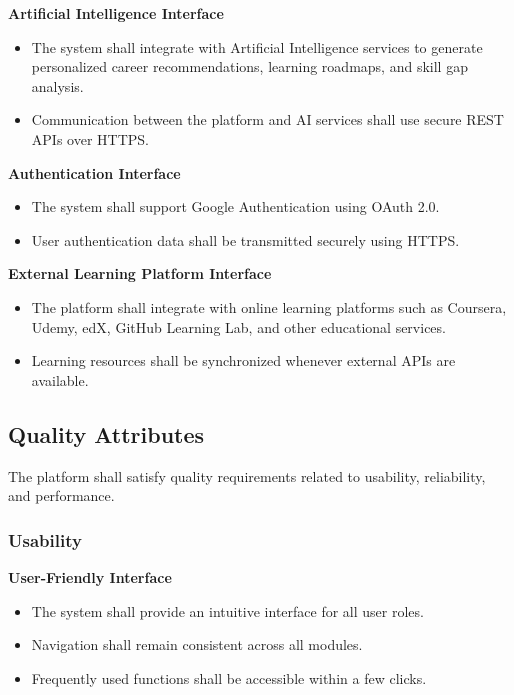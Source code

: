 \textbf{Artificial Intelligence Interface}

\begin{itemize}
    \item The system shall integrate with Artificial Intelligence services to generate personalized career recommendations, learning roadmaps, and skill gap analysis.
    \item Communication between the platform and AI services shall use secure REST APIs over HTTPS.
\end{itemize}

\textbf{Authentication Interface}

\begin{itemize}
    \item The system shall support Google Authentication using OAuth 2.0.
    \item User authentication data shall be transmitted securely using HTTPS.
\end{itemize}

\textbf{External Learning Platform Interface}

\begin{itemize}
    \item The platform shall integrate with online learning platforms such as Coursera, Udemy, edX, GitHub Learning Lab, and other educational services.
    \item Learning resources shall be synchronized whenever external APIs are available.
\end{itemize}

\subsection{Quality Attributes}

The platform shall satisfy quality requirements related to usability, reliability, and performance.
\subsubsection{Usability}

\textbf{User-Friendly Interface}

\begin{itemize}
    \item The system shall provide an intuitive interface for all user roles.
    \item Navigation shall remain consistent across all modules.
    \item Frequently used functions shall be accessible within a few clicks.
\end{itemize}

